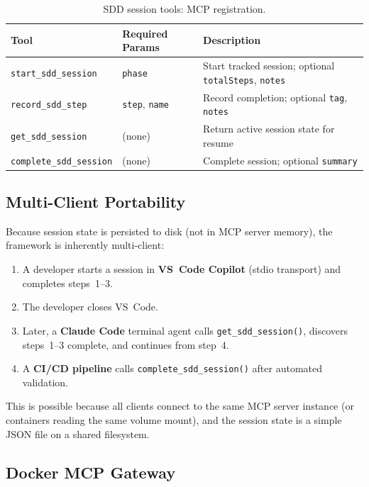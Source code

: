 \documentclass[11pt,letterpaper]{article}
\begin{document}
\begin{table}[h]
\centering
\caption{SDD session tools: MCP registration.}
\label{tab:tools}
\begin{tabular}{@{}llp{5.5cm}@{}}
\toprule
\textbf{Tool} & \textbf{Required Params} & \textbf{Description} \\
\midrule
\texttt{start\_sdd\_session}    & \texttt{phase} &
    Start tracked session; optional \texttt{totalSteps}, \texttt{notes} \\
\texttt{record\_sdd\_step}      & \texttt{step}, \texttt{name} &
    Record completion; optional \texttt{tag}, \texttt{notes} \\
\texttt{get\_sdd\_session}      & (none) &
    Return active session state for resume \\
\texttt{complete\_sdd\_session} & (none) &
    Complete session; optional \texttt{summary} \\
\bottomrule
\end{tabular}
\end{table}

\subsection{Multi-Client Portability}

Because session state is persisted to disk (not in MCP server memory),
the framework is inherently multi-client:

\begin{enumerate}[nosep]
    \item A developer starts a session in \textbf{VS~Code Copilot}
          (stdio transport) and completes steps~1--3.
    \item The developer closes VS~Code.
    \item Later, a \textbf{Claude Code} terminal agent calls
          \texttt{get\_sdd\_session()}, discovers steps~1--3 complete,
          and continues from step~4.
    \item A \textbf{CI/CD pipeline} calls
          \texttt{complete\_sdd\_session()} after automated validation.
\end{enumerate}

This is possible because all clients connect to the same MCP server
instance (or containers reading the same volume mount), and the session
state is a simple JSON file on a shared filesystem.

\subsection{Docker MCP Gateway}
\end{document}
